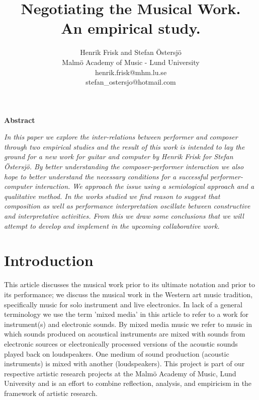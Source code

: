 \documentclass[10pt,letterpaper]{article}
\begin{document}
\twocolumn

\title{\textbf{Negotiating the Musical Work. \\An empirical study.}}
\author{
Henrik Frisk and Stefan \"{O}stersj\"{o}\\
Malm\"{o} Academy of
Music - Lund University \\
henrik.frisk@mhm.lu.se\\
stefan\_ostersjo@hotmail.com\\
}
\date{}     %
\maketitle

\pagestyle{empty}          %
\thispagestyle{empty}      %


\begin{center}
\large{\textbf{Abstract}}

\end{center}
\hspace*{-0.1in}                       %
\noindent
\textit{
In this paper we explore the inter-relations between performer and
composer through two empirical studies and the result of this work is 
intended to lay the
ground for a new work for guitar and computer by Henrik Frisk for
Stefan \"{O}stersj\"{o}. By better understanding the composer-performer
interaction we also hope to better understand the necessary conditions
for a successful performer-computer interaction. We approach the issue
using a semiological approach and a qualitative method. In the works
studied we find reason to suggest that composition as well as performance interpretation oscillate between constructive and interpretative
activities. From this we draw some conclusions that we will attempt to
develop and implement in the upcoming collaborative work.
}

\section{Introduction}
This article discusses the musical work prior to its ultimate notation
and prior to its performance; we discuss the musical work in the Western
art music tradition, specifically music for solo instrument and live
electronics. In lack of a general terminology we use the term 'mixed
media' in this article to refer to a work for instrument(s) and
electronic sounds. By mixed media music we refer to music in which
sounds produced on acoustical instruments are mixed with sounds from
electronic sources or electronically processed versions of the acoustic
sounds played back on loudspeakers. One medium of sound production
(acoustic instruments) is mixed with another (loudspeakers). This
project is part of our respective artistic research projects at the
Malm\"{o} Academy of Music, Lund University and is an effort to combine
reflection, analysis, and empiricism in the framework of artistic
research.
\end{document}
